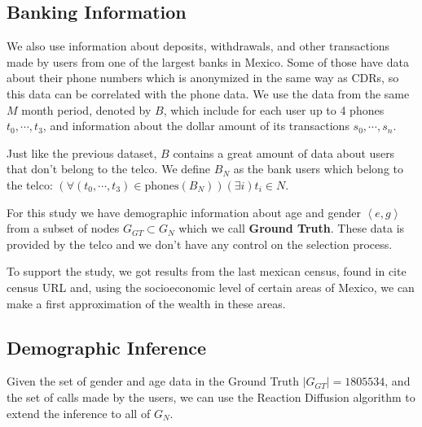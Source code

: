 \subsection{Banking Information}

We also use information about deposits, withdrawals, and other transactions made by users from one of the largest banks in Mexico. Some of those have data about their phone numbers which is anonymized in the same way as CDRs, so this data can be correlated with the phone data. We use the data from the same \( M \) month period, denoted by \( B \), which include for each user up to 4 phones \( t_0, \cdots, t_3 \), and information about the dollar amount of its transactions \( s_0, \cdots, s_n \).

Just like the previous dataset, \( B \) contains a great amount of data about users that don't belong to the telco. We define \( B_N \) as the bank users which belong to the telco: \( \left( \forall \left( t_0, \cdots, t_3 \right) \in \text{phones}\left( B_N \right) \right) \left( \exists i \right) t_i \in N \).

For this study we have demographic information about age and gender \( \left< e, g \right> \) from a subset of nodes \( G_{GT} \subset G_N \) which we call \textbf{Ground Truth}. These data is provided by the telco and we don't have any control on the selection process.

To support the study, we got results from the last mexican census, found in {cite census URL} and, using the socioeconomic level of certain areas of Mexico, we can make a first approximation of the wealth in these areas.

\subsection{Demographic Inference}

Given the set of gender and age data in the Ground Truth \( \left| G_{GT} \right| = 1805534 \), and the set of calls made by the users, we can use the Reaction Diffusion algorithm \cite{brea2014} to extend the inference to all of \( G_N \).


